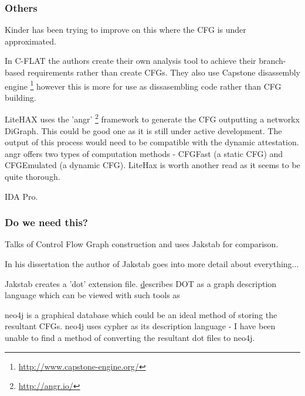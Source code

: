 \subsubsection{Others}

Kinder \cite{Kinder2012} has been trying to improve on this where the CFG is under approximated.

In C-FLAT \cite{Abera2016} the authors create their own analysis tool to achieve their branch-based requirements rather than create CFGs. They also use Capstone disassembly engine \footnote{\url{http://www.capstone-engine.org/}} however this is more for use as dissasembling code rather than CFG building.

LiteHAX \cite{Dessouky2018} uses the 'angr' \footnote{\url{http://angr.io/}} \cite{Shoshitaishvili2016} framework to generate the CFG outputting a networkx DiGraph. This could be good one as it is still under active development. The output of this process would need to be compatible with the dynamic attestation. angr offers two types of computation methods - CFGFast (a static CFG) and CFGEmulated (a dynamic CFG). LiteHax is worth another read as it seems to be quite thorough.

IDA Pro. 

\subsubsection{Do we need this?}
\cite{Nguyen2013} Talks of Control Flow Graph construction and uses Jakstab \cite{Kinder2008} for comparison. 


In his dissertation \cite{Kinder2010} the author of Jakstab goes into more detail about everything...

Jakstab creates a 'dot' extension file. \href{https://en.wikipedia.org/wiki/DOT_(graph_description_language)} describes DOT as a graph description language which can be viewed with such tools as 

neo4j is a graphical database which could be an ideal method of storing the resultant CFGs. neo4j uses cypher as its description language - I have been unable to find a method of converting the resultant dot files to neo4j.